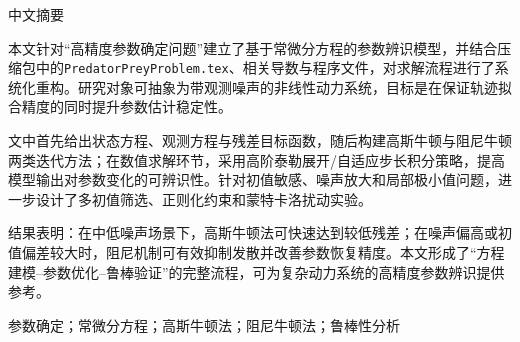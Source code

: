 \thispagestyle{plain}
{}
\centerline{\heiti 中文摘要}

\linespread{1.4}\bigskip

本文针对“高精度参数确定问题”建立了基于常微分方程的参数辨识模型，并结合压缩包中的\texttt{PredatorPreyProblem.tex}、相关导数与程序文件，对求解流程进行了系统化重构。研究对象可抽象为带观测噪声的非线性动力系统，目标是在保证轨迹拟合精度的同时提升参数估计稳定性。

文中首先给出状态方程、观测方程与残差目标函数，随后构建高斯牛顿与阻尼牛顿两类迭代方法；在数值求解环节，采用高阶泰勒展开/自适应步长积分策略，提高模型输出对参数变化的可辨识性。针对初值敏感、噪声放大和局部极小值问题，进一步设计了多初值筛选、正则化约束和蒙特卡洛扰动实验。

结果表明：在中低噪声场景下，高斯牛顿法可快速达到较低残差；在噪声偏高或初值偏差较大时，阻尼机制可有效抑制发散并改善参数恢复精度。本文形成了“方程建模--参数优化--鲁棒验证”的完整流程，可为复杂动力系统的高精度参数辨识提供参考。

\bigskip
{}
参数确定；常微分方程；高斯牛顿法；阻尼牛顿法；鲁棒性分析
